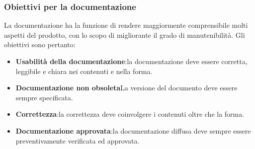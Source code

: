 \documentclass[12pt,a4paper]{article}
\begin{document}
\subsubsection{Obiettivi per la documentazione}
La documentazione ha la funzione di rendere maggiormente comprensibile molti aspetti del prodotto, con lo scopo di migliorante il grado di manutenibilità. 
Gli obiettivi sono pertanto:
\begin{itemize}
	\item\textbf{Usabilità della documentazione}:la documentazione deve essere corretta, leggibile e chiara nei contenuti e nella forma.
	\item\textbf{Documentazione non obsoleta}La versione del documento deve essere sempre specificata.
	\item\textbf{Correttezza}:la correttezza deve coinvolgere i contenuti oltre che la forma.
	\item\textbf{Documentazione approvata}:la documentazione diffusa deve sempre essere preventivamente verificata ed approvata.
\end{itemize}
\end{document}

